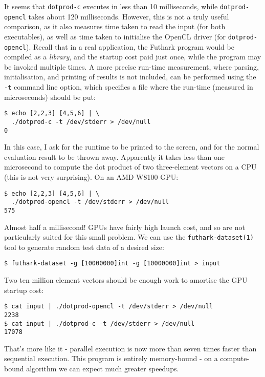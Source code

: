 \documentclass[11pt]{book}
\begin{document}
It seems that \texttt{dotprod-c} executes in less than 10
milliseconds, while \texttt{dotprod-opencl} takes about 120
milliseconds.  However, this is not a truly useful comparison, as it
also measures time taken to read the input (for both executables), as
well as time taken to initialise the OpenCL driver (for
\texttt{dotprod-opencl}).  Recall that in a real application, the
Futhark program would be compiled as a \textit{library}, and the
startup cost paid just once, while the program may be invoked multiple
times.  A more precise run-time measurement, where parsing,
initialisation, and printing of results is not included, can be
performed using the \texttt{-t} command line option, which specifies a
file where the run-time (measured in microseconds) should be put:

\begin{verbatim}
$ echo [2,2,3] [4,5,6] | \
  ./dotprod-c -t /dev/stderr > /dev/null
0
\end{verbatim}

In this case, I ask for the runtime to be printed to the screen, and
for the normal evaluation result to be thrown away.  Apparently it
takes less than one microsecond to compute the dot product of two
three-element vectors on a CPU (this is not very surprising).  On an
AMD W8100 GPU:

\begin{verbatim}
$ echo [2,2,3] [4,5,6] | \
  ./dotprod-opencl -t /dev/stderr > /dev/null
575
\end{verbatim}

Almost half a millisecond!  GPUs have fairly high launch cost, and so
are not particularly suited for this small problem.  We can use the
\texttt{futhark-dataset(1)} tool to generate random test data of a
desired size:

\begin{verbatim}
$ futhark-dataset -g [10000000]int -g [10000000]int > input
\end{verbatim}

Two ten million element vectors should be enough work to amortise the
GPU startup cost:

\begin{verbatim}
$ cat input | ./dotprod-opencl -t /dev/stderr > /dev/null
2238
$ cat input | ./dotprod-c -t /dev/stderr > /dev/null
17078
\end{verbatim}

That's more like it - parallel execution is now more than seven times
faster than sequential execution.  This program is entirely
memory-bound - on a compute-bound algorithm we can expect much greater
speedups.
\end{document}
